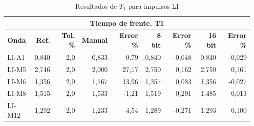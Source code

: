 \vspace{3\baselineskip}
\begin{table}[H]
    \centering
    \begin{tabular}{@{}lrrrrrrrr@{}}
        \toprule
        \multicolumn{9}{c}{\textbf{Tiempo de frente, T1}}                                                                                                                 \\ \midrule
        \textbf{Onda} & \textbf{Ref.} & \textbf{Tol. \%} & \textbf{Manual} & \textbf{Error \%} & \textbf{8 bit} & \textbf{Error \%} & \textbf{16 bit} & \textbf{Error \%} \\ \midrule
        LI-A1         & 0,840         & 2,0              & 0,833           & 0,79              & 0,840          & -0,048            & 0,840           & -0,029            \\ \midrule
        LI-M5         & 2,746         & 2,0              & 2,000           & 27,17             & 2,750          & 0,162             & 2,750           & 0,161             \\ \midrule
        LI-M6         & 1,356         & 2,0              & 1,167           & 13,96             & 1,357          & 0,083             & 1,356           & -0,027            \\ \midrule
        LI-M8         & 1,515         & 2,0              & 1,533           & -1,21             & 1,519          & 0,291             & 1,485           & 0,013             \\ \midrule
        LI-M12        & 1,292         & 2,0              & 1,233           & 4,54              & 1,289          & -0,271            & 1,293           & 0,100             \\ \bottomrule
    \end{tabular}
    \caption{Resultados de $T_1$ para impulsos LI}
    \label{tab:resultados_t1_li}
\end{table}
\vspace{3\baselineskip}

